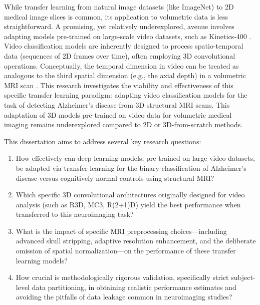 \documentclass[11pt, a4paper]{article}
\begin{document}
While transfer learning from natural image datasets (like ImageNet) to 2D medical image slices is common, its application to volumetric data is less straightforward. A promising, yet relatively underexplored, avenue involves adapting models pre-trained on large-scale video datasets, such as Kinetics-400 \cite{tran2018closer}. Video classification models are inherently designed to process spatio-temporal data (sequences of 2D frames over time), often employing 3D convolutional operations. Conceptually, the temporal dimension in video can be treated as analogous to the third spatial dimension (e.g., the axial depth) in a volumetric MRI scan \cite{tran2018closer, wu20223d}. This research investigates the viability and effectiveness of this specific transfer learning paradigm: adapting video classification models for the task of detecting Alzheimer's disease from 3D structural MRI scans. This adaptation of 3D models pre-trained on video data for volumetric medical imaging remains underexplored compared to 2D or 3D-from-scratch methods.

This dissertation aims to address several key research questions:
\begin{enumerate}
    \item How effectively can deep learning models, pre-trained on large video datasets, be adapted via transfer learning for the binary classification of Alzheimer's disease versus cognitively normal controls using structural MRI?
    \item Which specific 3D convolutional architectures originally designed for video analysis (such as R3D, MC3, R(2+1)D) yield the best performance when transferred to this neuroimaging task?
    \item What is the impact of specific MRI preprocessing choices—including advanced skull stripping, adaptive resolution enhancement, and the deliberate omission of spatial normalization—on the performance of these transfer learning models?
    \item How crucial is methodologically rigorous validation, specifically strict subject-level data partitioning, in obtaining realistic performance estimates and avoiding the pitfalls of data leakage common in neuroimaging studies?
\end{enumerate}
\end{document}

